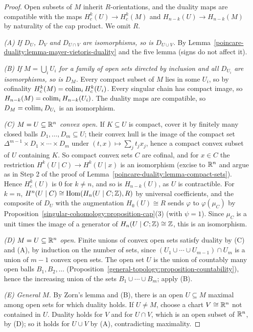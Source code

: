 \begin{proof}
Open subsets of $M$ inherit $R$-orientations, and the duality maps are compatible with the maps $H^k_c(U) \to H^k_c(M)$ and $H_{n-k}(U) \to H_{n-k}(M)$ by naturality of
the cap product. We omit $R$.

\emph{(A) If $D_U$, $D_V$ and $D_{U \cap V}$ are isomorphisms, so is $D_{U \cup V}$.} By Lemma~\ref{poincare-duality:lemma-mayer-vietoris-duality} and the five lemma (signs do
not affect it).

\emph{(B) If $M = \bigcup_i U_i$ for a family of open sets directed by inclusion and all $D_{U_i}$ are isomorphisms, so is $D_M$.} Every compact subset of $M$ lies in some
$U_i$, so by cofinality $H^k_c(M) = \operatorname*{colim}_i H^k_c(U_i)$. Every singular chain has compact image, so $H_{n-k}(M) = \operatorname*{colim}_i H_{n-k}(U_i)$. The duality maps are compatible,
so $D_M = \operatorname*{colim}_i D_{U_i}$ is an isomorphism.

\emph{(C) $M = U \subseteq \mathbb{R}^n$ convex open.} If $K \subseteq U$ is compact, cover it by finitely many closed balls $D_1, \ldots, D_m \subseteq U$; their convex hull is the image of the
compact set $\Delta^{m-1} \times D_1 \times \cdots \times D_m$ under $(t, x) \mapsto \sum_j t_jx_j$, hence a compact convex subset of $U$ containing $K$. So compact convex sets $C$ are
cofinal, and for $x \in C$ the restriction $H^k(U \mid C) \to H^k(U \mid x)$ is an isomorphism (excise to $\mathbb{R}^n$ and argue as in Step 2 of the proof of
Lemma~\ref{poincare-duality:lemma-compact-sets}). Hence $H^k_c(U)$ is $0$ for $k \neq n$, and so is $H_{n-k}(U)$, as $U$ is contractible. For $k = n$, $H^n(U \mid C) \cong \operatorname{Hom}(H_n(U \mid C; \mathbb{Z}), R)$
by universal coefficients, and the composite of $D_U$ with the augmentation $H_0(U) \cong R$ sends $\varphi$ to $\varphi(\mu_C)$ by Proposition~\ref{singular-cohomology:proposition-cap}(3)
(with $\psi = 1$). Since $\mu_C$ is a unit times the image of a generator of $H_n(U \mid C; \mathbb{Z}) \cong \mathbb{Z}$, this is an isomorphism.

\emph{(D) $M = U \subseteq \mathbb{R}^n$ open.} Finite unions of convex open sets satisfy duality by (C) and (A), by induction on the number of sets, since
$(U_1 \cup \cdots \cup U_{m-1}) \cap U_m$ is a union of $m - 1$ convex open sets. The open set $U$ is the union of countably many open balls $B_1, B_2, \ldots$
(Proposition~\ref{general-topology:proposition-countability}), hence the increasing union of the sets $B_1 \cup \cdots \cup B_m$; apply (B).

\emph{(E) General $M$.} By Zorn's lemma and (B), there is an open $U \subseteq M$ maximal among open sets for which duality holds. If $U \neq M$, choose a chart $V \cong \mathbb{R}^n$ not contained in
$U$. Duality holds for $V$ and for $U \cap V$, which is an open subset of $\mathbb{R}^n$, by (D); so it holds for $U \cup V$ by (A), contradicting maximality.
\end{proof}

